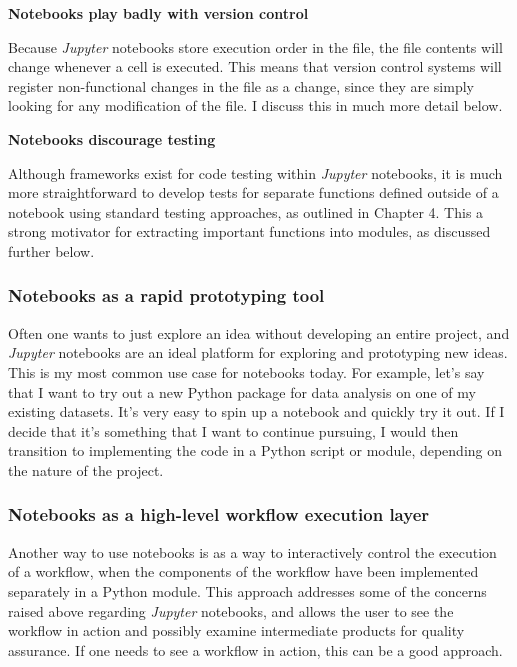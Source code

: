 \textbf{Notebooks play badly with version control}

Because \textit{Jupyter} notebooks store execution order in the file, the file contents will change whenever a cell is executed.  This means that version control systems will register non-functional changes in the file as a change, since they are simply looking for any modification of the file.  I discuss this in much more detail below.

\textbf{Notebooks discourage testing}

Although frameworks exist for code testing within \textit{Jupyter} notebooks, it is much more straightforward to develop tests for separate functions defined outside of a notebook using standard testing approaches, as outlined in Chapter 4.  This a strong motivator for extracting important functions into modules, as discussed further below.

\subsubsection{Notebooks as a rapid prototyping tool}

Often one wants to just explore an idea without developing an entire project, and \textit{Jupyter} notebooks are an ideal platform for exploring and prototyping new ideas.  This is my most common use case for notebooks today.  For example, let's say that I want to try out a new Python package for data analysis on one of my existing datasets.  It's very easy to spin up a notebook and quickly try it out.  If I decide that it's something that I want to continue pursuing, I would then transition to implementing the code in a Python script or module, depending on the nature of the project.

\subsubsection{Notebooks as a high-level workflow execution layer}

Another way to use notebooks is as a way to interactively control the execution of a workflow, when the components of the workflow have been implemented separately in a Python module.  This approach addresses some of the concerns raised above regarding \textit{Jupyter} notebooks, and allows the user to see the workflow in action and possibly examine intermediate products for quality assurance.  If one needs to see a workflow in action, this can be a good approach.

